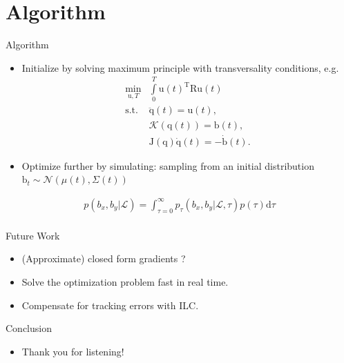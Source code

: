 \documentclass[handout]{beamer}
\newcommand{\boldvec}[1]{\boldsymbol{\mathrm{#1}}}
\let\vec\boldvec
\newcommand{\kin}{\mathcal{K}} %
\newcommand{\jacobian}{\vec{J}(\joint)} %
\newcommand{\joint}{\vec{q}} %
\newcommand{\sysInput}{\vec{u}} %
\newcommand{\ball}{\vec{b}} %
\newcommand{\landTime}{\tau} %
\newcommand{\landEvent}{\mathcal{L}} %
\newcommand{\landDist}{p(\tau)} %
\begin{document}
\section{Algorithm}
%
\begin{frame}{Algorithm}
\begin{itemize}
\item Initialize by solving maximum principle with transversality conditions, e.g.
%
\begin{align}
\min_{\sysInput,T} & \int\limits_{0}^{T}\sysInput(t)^{\mathrm{T}}\vec{R}\sysInput(t) \\
\textrm{s.t. } & \ddot{\joint}(t) = \sysInput(t), \\
& \kin(\joint(t)) = \ball(t), \\
& \jacobian \dot{\joint}(t) = -\dot{\ball}(t).
\label{costFnc2}
\end{align}
%
\item Optimize further by simulating: sampling from an initial distribution $\ball_t \sim \mathcal{N}(\mu(t),\Sigma(t))$
\end{itemize}
\begin{align}
p(b_x,b_y|\landEvent) = \int_{\landTime = 0}^{\infty} p_{\landTime}(b_x,b_y|\landEvent,\landTime)\landDist \textrm{d}\landTime
\label{marginalProcess} \\
\end{align}
\end{frame}
%
\begin{frame}{Future Work}
\begin{itemize}
\item (Approximate) closed form gradients ?
\item Solve the optimization problem fast in real time.
\item Compensate for tracking errors with ILC.
\end{itemize}
\end{frame}
%
\begin{frame}{Conclusion}
\begin{itemize}
\item Thank you for listening!
\end{itemize}
\end{frame}	
%
%
%

%
\end{document}
